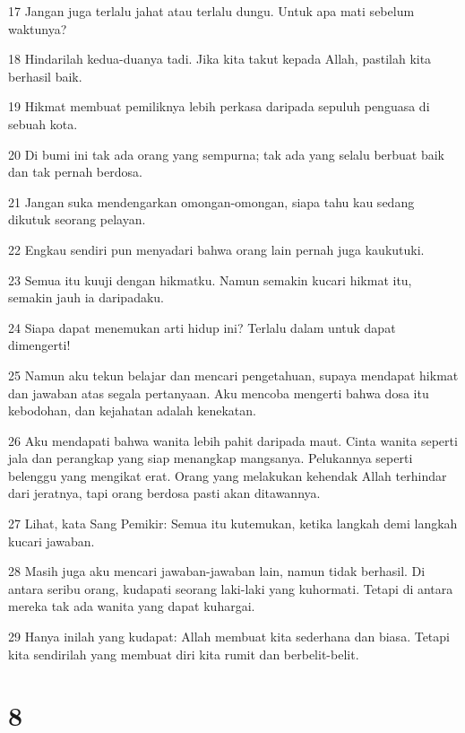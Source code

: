 \par 17 Jangan juga terlalu jahat atau terlalu dungu. Untuk apa mati sebelum waktunya?
\par 18 Hindarilah kedua-duanya tadi. Jika kita takut kepada Allah, pastilah kita berhasil baik.
\par 19 Hikmat membuat pemiliknya lebih perkasa daripada sepuluh penguasa di sebuah kota.
\par 20 Di bumi ini tak ada orang yang sempurna; tak ada yang selalu berbuat baik dan tak pernah berdosa.
\par 21 Jangan suka mendengarkan omongan-omongan, siapa tahu kau sedang dikutuk seorang pelayan.
\par 22 Engkau sendiri pun menyadari bahwa orang lain pernah juga kaukutuki.
\par 23 Semua itu kuuji dengan hikmatku. Namun semakin kucari hikmat itu, semakin jauh ia daripadaku.
\par 24 Siapa dapat menemukan arti hidup ini? Terlalu dalam untuk dapat dimengerti!
\par 25 Namun aku tekun belajar dan mencari pengetahuan, supaya mendapat hikmat dan jawaban atas segala pertanyaan. Aku mencoba mengerti bahwa dosa itu kebodohan, dan kejahatan adalah kenekatan.
\par 26 Aku mendapati bahwa wanita lebih pahit daripada maut. Cinta wanita seperti jala dan perangkap yang siap menangkap mangsanya. Pelukannya seperti belenggu yang mengikat erat. Orang yang melakukan kehendak Allah terhindar dari jeratnya, tapi orang berdosa pasti akan ditawannya.
\par 27 Lihat, kata Sang Pemikir: Semua itu kutemukan, ketika langkah demi langkah kucari jawaban.
\par 28 Masih juga aku mencari jawaban-jawaban lain, namun tidak berhasil. Di antara seribu orang, kudapati seorang laki-laki yang kuhormati. Tetapi di antara mereka tak ada wanita yang dapat kuhargai.
\par 29 Hanya inilah yang kudapat: Allah membuat kita sederhana dan biasa. Tetapi kita sendirilah yang membuat diri kita rumit dan berbelit-belit.

\chapter{8}

